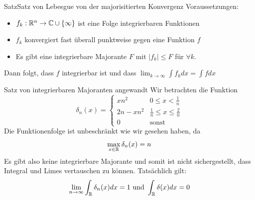 \begin{Satz}{Satz}{Satz von Lebesgue von der majorisitierten Konvergenz}
    Voraussetzungen:
    \begin{itemize}
        \item $f_k:\mathbb{R}^n\rightarrow \mathbb{C} \cup \{ \infty\}$ ist eine Folge integrierbaren Funktionen
        \item $f_k$ konvergiert fast überall punktweise gegen eine Funktion $f$
        \item Es gibt eine integrierbare Majorante $F$ mit $|f_k|\leq F$ für $\forall k$.
    \end{itemize}
    Dann folgt, dass $f$ integrierbar ist und dass $\lim_{k\rightarrow \infty} \int f_k dx = \int f dx$
\end{Satz}
\begin{Beispiel}{Satz von integrierbaren Majoranten angewandt}
    Wir betrachten die Funktion
    $$\delta_n(x)=\begin{cases}
        xn^2 & 0\leq x< \frac{1}{n} \\
        2n-xn^2 & \frac{1}{n} \leq x \leq \frac{2}{n} \\
        0 & \mbox{sonst}
    \end{cases}$$
    Die Funktionenfolge ist unbeschränkt wie wir gesehen haben, da
    $$\max_{x\in\mathbb{R}} \delta_n(x)=n$$
    Es gibt also keine integrierbare Majorante und somit ist nicht sichergestellt, dass Integral und Limes vertauschen zu können. Tatsächlich gilt:
    $$\lim_{n\rightarrow \infty} \int_{\mathbb{R}} \delta_n(x) dx = 1 \mbox{ und } \int_{\mathbb{R}} \delta(x)dx = 0$$
\end{Beispiel}

